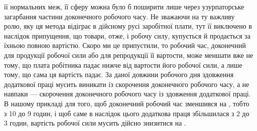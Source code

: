 \parcont{}  %
її нормальних меж, її сферу можна було б поширити лише через
узурпаторське загарбання частини доконечного робочого часу.
Не зважаючи на ту важливу ролю, яку ця метода відіграє в дійсному
русі заробітної плати, тут її виключено в наслідок припущення,
що товари, отже, і робочу силу, купується й продається
за їхньою повною вартістю. Скоро ми це припустили, то робочий
час, доконечний для продукції робочої сили або для репродукції
її вартости, може меншати вже не тому, що плата робітника падає
нижче від вартости його робочої сили, а лише тому, що сама ця
вартість падає. За даної довжини робочого дня здовження додаткової
праці мусить виникати із скорочення доконечного робочого
часу, а не навпаки — скорочення доконечного робочого часу із
здовження додаткової праці. В нашому прикладі для того, щоб
доконечний робочий час зменшився на , тобто з 10 до 9 годин,
і щоб саме в наслідок цього додаткова праця збільшилася з 2 до
3 годин, вартість робочої сили мусить дійсно знизитися на .

